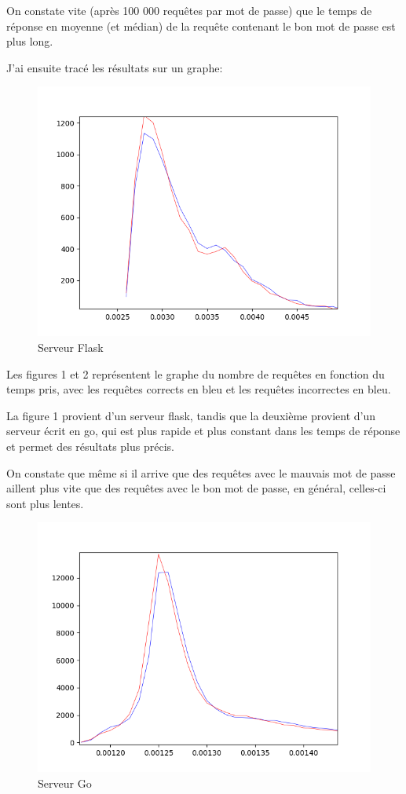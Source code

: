 \documentclass{article}
\begin{document}
On constate vite (après 100 000 requêtes par mot de passe) que le temps de réponse en moyenne (et médian) de la requête contenant le bon mot de passe est plus long.

J'ai ensuite tracé les résultats sur un graphe:

\begin{figure}
    \caption{Serveur Flask}
    \includegraphics[scale=0.6]{results_plot.png}
\end{figure}


Les figures 1 et 2 représentent le graphe du nombre de requêtes en fonction du temps pris, avec les requêtes corrects en bleu et les requêtes incorrectes en bleu.

La figure 1 provient d'un serveur flask, tandis que la deuxième provient d'un serveur écrit en go, qui est plus rapide et plus constant dans les temps de réponse et permet des résultats plus précis.

On constate que même si il arrive que des requêtes avec le mauvais mot de passe aillent plus vite que des requêtes avec le bon mot de passe, en général, celles-ci sont plus lentes.

\begin{figure}
    \caption{Serveur Go}
    \includegraphics[scale=0.6]{results_plot_go.png}
\end{figure}
\end{document}
